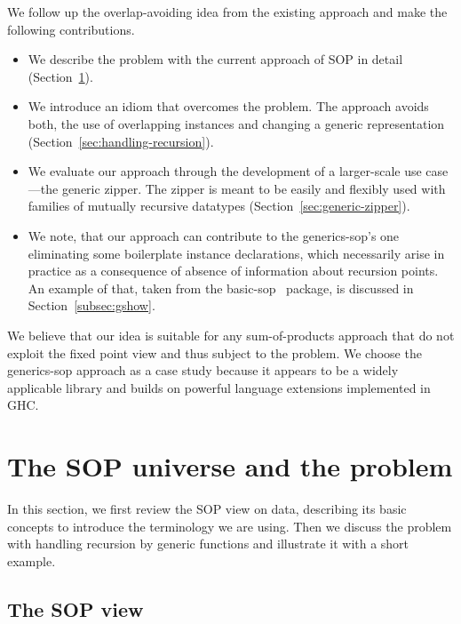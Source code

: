 \documentclass[runningheads]{llncs}
\begin{document}
We follow up the overlap-avoiding idea from the existing approach and make the following contributions.
\begin{itemize}
\item We describe the problem with the current approach of SOP in detail (Section~\ref{sec:sop-problem}).
\item We introduce an idiom that overcomes the problem. The approach avoids both, the use of overlapping instances and changing a generic representation (Section~\ref{sec:handling-recursion}).
\item We evaluate our approach through the development of a larger-scale use case---the generic zipper. The zipper is meant to be easily and flexibly used with families of mutually recursive datatypes (Section~\ref{sec:generic-zipper}).
\item We note, that our approach can contribute to the \textsf{generics-sop}'s one eliminating some boilerplate instance declarations, which necessarily  arise in practice as a consequence of absence of information about recursion points. An example of that, taken from the \textsf{basic-sop}~\cite{basic-sop} package, is discussed in Section~\ref{subsec:gshow}.
\end{itemize}

We believe that our idea is suitable for any sum-of-products approach that do not exploit the fixed point view and thus subject to the problem. We choose the \textsf{generics-sop} approach as a case study because it appears to be a widely applicable library and builds on powerful language extensions implemented in GHC.

\section{The SOP universe and the problem}
\label{sec:sop-problem}

In this section, we first review the SOP view on data, describing its basic concepts to introduce the terminology we are using. Then we discuss the problem with handling recursion by generic functions and illustrate it with a short example.

\subsection{The SOP view}
\label{sec:sop-view}
\end{document}
